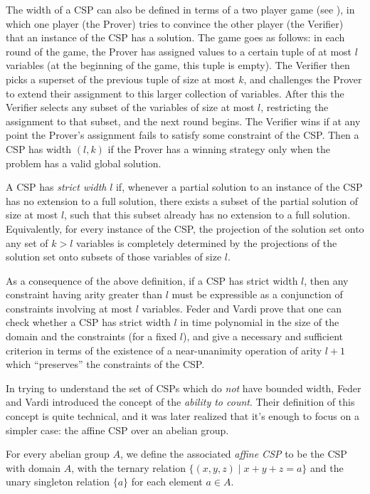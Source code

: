\documentclass[letterpaper,11pt]{article}
\begin{document}
The width of a CSP can also be defined in terms of a two player game (see \cite{pebble-game-width}), in which one player (the Prover) tries to convince the other player (the Verifier) that an instance of the CSP has a solution. The game goes as follows: in each round of the game, the Prover has assigned values to a certain tuple of at most $l$ variables (at the beginning of the game, this tuple is empty). The Verifier then picks a superset of the previous tuple of size at most $k$, and challenges the Prover to extend their assignment to this larger collection of variables. After this the Verifier selects any subset of the variables of size at most $l$, restricting the assignment to that subset, and the next round begins. The Verifier wins if at any point the Prover's assignment fails to satisfy some constraint of the CSP. Then a CSP has width $(l,k)$ if the Prover has a winning strategy only when the problem has a valid global solution.

\begin{defn} A CSP has \emph{strict width} $l$ if, whenever a partial solution to an instance of the CSP has no extension to a full solution, there exists a subset of the partial solution of size at most $l$, such that this subset already has no extension to a full solution. Equivalently, for every instance of the CSP, the projection of the solution set onto any set of $k > l$ variables is completely determined by the projections of the solution set onto subsets of those variables of size $l$.
\end{defn}

As a consequence of the above definition, if a CSP has strict width $l$, then any constraint having arity greater than $l$ must be expressible as a conjunction of constraints involving at most $l$ variables. Feder and Vardi \cite{feder-vardi} prove that one can check whether a CSP has strict width $l$ in time polynomial in the size of the domain and the constraints (for a fixed $l$), and give a necessary and sufficient criterion in terms of the existence of a near-unanimity operation of arity $l+1$ which ``preserves'' the constraints of the CSP.

In trying to understand the set of CSPs which do \emph{not} have bounded width, Feder and Vardi \cite{feder-vardi} introduced the concept of the \emph{ability to count}. Their definition of this concept is quite technical, and it was later realized that it's enough to focus on a simpler case: the affine CSP over an abelian group.

\begin{defn} For every abelian group $A$, we define the associated \emph{affine CSP} to be the CSP with domain $A$, with the ternary relation $\{(x,y,z) \mid x+y+z = a\}$ and the unary singleton relation $\{a\}$ for each element $a \in A$.
\end{defn}
\end{document}
